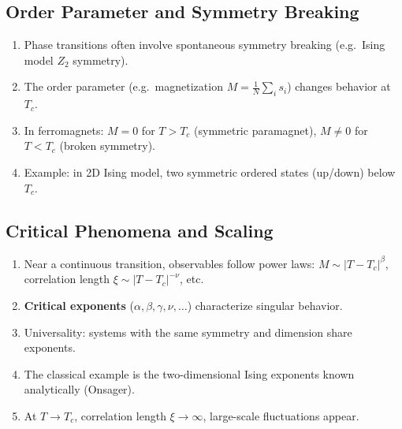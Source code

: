 \documentclass[%
oneside,                 %
final,                   %
10pt]{article}
\begin{document}
\subsection{Order Parameter and Symmetry Breaking}
\begin{enumerate}
\item Phase transitions often involve spontaneous symmetry breaking (e.g.\ Ising model $Z_2$ symmetry).

\item The order parameter (e.g.\ magnetization $M = \frac{1}{N}\sum_i s_i$) changes behavior at $T_c$.

\item In ferromagnets: $M=0$ for $T>T_c$ (symmetric paramagnet), $M\neq 0$ for $T<T_c$ (broken symmetry).

\item Example: in 2D Ising model, two symmetric ordered states (up/down) below $T_c$.
\end{enumerate}

\noindent
\subsection{Critical Phenomena and Scaling}

\begin{enumerate}
\item Near a continuous transition, observables follow power laws: $M \sim |T-T_c|^\beta$, correlation length $\xi \sim |T-T_c|^{-\nu}$, etc.

\item \textbf{Critical exponents} ($\alpha,\beta,\gamma,\nu,\dots$) characterize singular behavior.

\item Universality: systems with the same symmetry and dimension share exponents.

\item The classical example is the  two-dimensional  Ising exponents known analytically (Onsager).

\item At $T\to T_c$, correlation length $\xi\to\infty$, large-scale fluctuations appear.
\end{enumerate}

\noindent
\end{document}
